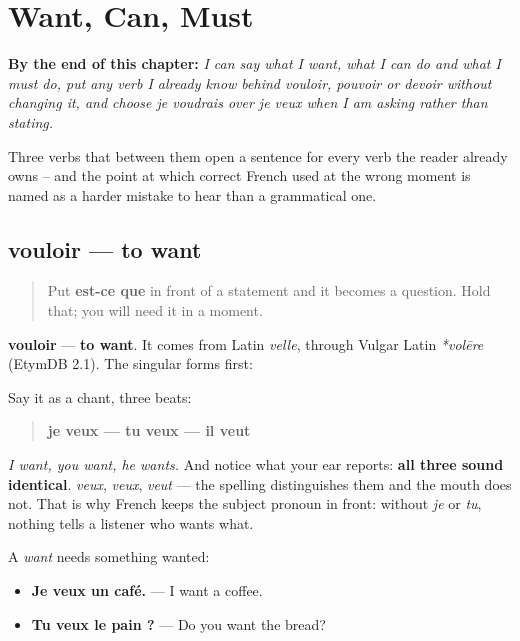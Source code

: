 
\chapter{Want, Can, Must}
\label{ch:fr-modaux}

\begin{chapteropening}
\textbf{By the end of this chapter:} \emph{I can say what I want, what I can do and what I must do, put any verb I already know behind vouloir, pouvoir or devoir without changing it, and choose je voudrais over je veux when I am asking rather than stating.}

Three verbs that between them open a sentence for every verb the reader already owns -- and the point at which correct French used at the wrong moment is named as a harder mistake to hear than a grammatical one.
\end{chapteropening}

\section[vouloir]{vouloir — to want}

\label{lesson:FR-C33-vouloir}



\begin{quote}
Put \textbf{est-ce que} in front of a statement and it becomes a question. Hold that; you will need it in a moment.
\end{quote}

\begin{cousinweb}
\textbf{vouloir} — \textbf{to want}. It comes from Latin \emph{velle}, through Vulgar Latin \emph{*volēre} (EtymDB 2.1). The singular forms first:

Say it as a chant, three beats:

\begin{quote}
\textbf{je veux — tu veux — il veut}
\end{quote}

\emph{I want, you want, he wants.} And notice what your ear reports: \textbf{all three sound identical}. \emph{veux}, \emph{veux}, \emph{veut} — the spelling distinguishes them and the mouth does not. That is why French keeps the subject pronoun in front: without \emph{je} or \emph{tu}, nothing tells a listener who wants what.

A \emph{want} needs something wanted:

\begin{itemize}
\raggedright
  \item \textbf{Je veux un café.} — I want a coffee.
  \item \textbf{Tu veux le pain ?} — Do you want the bread?
\end{itemize}
\end{cousinweb}

